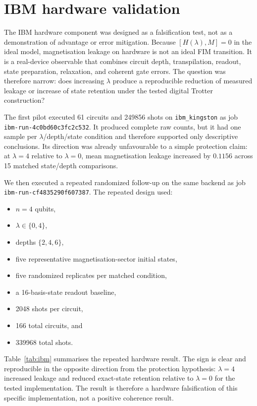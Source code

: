 \documentclass[preprint,aps,physrev,superscriptaddress,floatfix,longbibliography]{revtex4-2}
\begin{document}
\section{IBM hardware validation}

The IBM hardware component was designed as a falsification test, not as a
demonstration of advantage or error mitigation. Because
$[H(\lambda),M]=0$ in the ideal model, magnetisation leakage on hardware is not
an ideal FIM transition. It is a real-device observable that combines circuit
depth, transpilation, readout, state preparation, relaxation, and coherent gate
errors. The question was therefore narrow: does increasing $\lambda$ produce a
reproducible reduction of measured leakage or increase of state retention under
the tested digital Trotter construction?

The first pilot executed 61 circuits and 249856 shots on \texttt{ibm\_kingston}
as job \texttt{ibm-run-4c0bd60c3fc2c532}. It produced complete raw counts, but it
had one sample per $\lambda$/depth/state condition and therefore supported only
descriptive conclusions. Its direction was already unfavourable to a simple
protection claim: at $\lambda=4$ relative to $\lambda=0$, mean magnetisation
leakage increased by $0.1156$ across 15 matched state/depth comparisons.

We then executed a repeated randomized follow-up on the same backend as job
\texttt{ibm-run-cf4835290f607387}. The repeated design used:
%
\begin{itemize}
  \item $n=4$ qubits,
  \item $\lambda\in\{0,4\}$,
  \item depths $\{2,4,6\}$,
  \item five representative magnetisation-sector initial states,
  \item five randomized replicates per matched condition,
  \item a 16-basis-state readout baseline,
  \item 2048 shots per circuit,
  \item 166 total circuits, and
  \item 339968 total shots.
\end{itemize}

Table~\ref{tab:ibm} summarises the repeated hardware result. The sign is clear
and reproducible in the opposite direction from the protection hypothesis:
$\lambda=4$ increased leakage and reduced exact-state retention relative to
$\lambda=0$ for the tested implementation. The result is therefore a
hardware falsification of this specific implementation, not a positive
coherence result.
\end{document}
